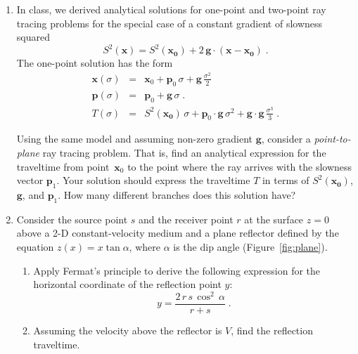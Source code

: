 \begin{enumerate}
\item In class, we derived analytical solutions for one-point and
two-point ray tracing problems for the special case of a constant
gradient of slowness squared 
\begin{equation}
  \label{eq:s2}
  S^2(\mathbf{x}) =
  S^2(\mathbf{x_0})+2\,\mathbf{g} \cdot (\mathbf{x}-\mathbf{x_0})\;.
\end{equation}
The one-point solution has the form
\begin{eqnarray}
  \label{eq:xgrad}
  \mathbf{x}(\sigma) & = & \mathbf{x}_0 + \mathbf{p}_0\,\sigma
  + \mathbf{g}\,\frac{\sigma^2}{2} \\
  \label{eq:pgrad}
  \mathbf{p}(\sigma) & = & \mathbf{p}_0 + \mathbf{g}\,\sigma\;. \\
  \label{eq:tgrad}
  T(\sigma) & = & S^2(\mathbf{x_0})\,\sigma +
  \mathbf{p}_0 \cdot \mathbf{g}\,\sigma^2 +  
  \mathbf{g} \cdot \mathbf{g}\,\frac{\sigma^3}{3}\;.
\end{eqnarray}

Using the same model and assuming non-zero gradient $\mathbf{g}$,
consider a \emph{point-to-plane} ray tracing problem. That is, find an
analytical expression for the traveltime from point~$\mathbf{x}_0$ to
the point where the ray arrives with the slowness vector
$\mathbf{p}_1$. Your solution should express the traveltime $T$ in
terms of $S^2(\mathbf{x_0})$, $\mathbf{g}$, and $\mathbf{p}_1$.  How
many different branches does this solution have?

\item Consider the source point $s$ and the receiver point $r$ at the
  surface $z=0$ above a 2-D constant-velocity medium and a plane
  reflector defined by the equation $z(x) = x \tan{\alpha}$, where
  $\alpha$ is the dip angle (Figure~\ref{fig:plane}). 


  \begin{enumerate}
  \item Apply Fermat's principle to derive the following expression for the
    horizontal coordinate of the reflection point $y$:
    \begin{equation}
      \label{eq:y}
      y = \frac{2\,r\,s\,\cos^2\,\alpha}{r + s}\;.
    \end{equation}
  \item Assuming the velocity above the reflector is $V$, find the
    reflection traveltime.
  \end{enumerate}
\end{enumerate}

